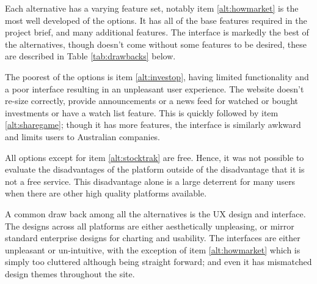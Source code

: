 Each alternative has a varying feature set, notably item \ref{alt:howmarket} is the most well developed of the options. It has all of the base features required in the project brief, and many additional features. The interface is markedly the best of the alternatives, though doesn't come without some features to be desired, these are described in Table \ref{tab:drawbacks} below.
    
The poorest of the options is item \ref{alt:investop}, having limited functionality and a poor interface resulting in an unpleasant user experience. The website doesn't re-size correctly, provide announcements or a news feed for watched or bought investments or have a watch list feature. This is quickly followed by item \ref{alt:sharegame}; though it has more features, the interface is similarly awkward and limits users to Australian companies.
    
All options except for item \ref{alt:stocktrak} are free. Hence, it was not possible to evaluate the disadvantages of the platform outside of the disadvantage that it is not a free service. This disadvantage alone is a large deterrent for many users when there are other high quality platforms available.
    
A common draw back among all the alternatives is the UX design and interface. The designs across all platforms are either aesthetically unpleasing, or mirror standard enterprise designs for charting and usability. The interfaces are either unpleasant or un-intuitive, with the exception of item \ref{alt:howmarket} which is simply too cluttered although being straight forward; and even it has mismatched design themes throughout the site.
    

